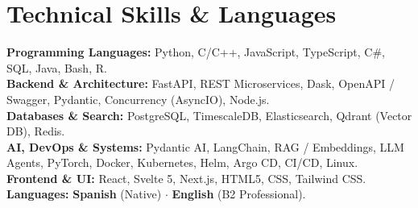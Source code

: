 \documentclass[a4paper,10pt]{article}
\begin{document}
\section*{Technical Skills \& Languages}

{\footnotesize
\noindent\textbf{Programming Languages:} Python, C/C++, JavaScript, TypeScript, C\#, SQL, Java, Bash, R. \\[2.5pt]
\textbf{Backend \& Architecture:} FastAPI, REST Microservices, Dask, OpenAPI / Swagger, Pydantic, Concurrency (AsyncIO), Node.js. \\[2.5pt]
\textbf{Databases \& Search:} PostgreSQL, TimescaleDB, Elasticsearch, Qdrant (Vector DB), Redis. \\[2.5pt]
\textbf{AI, DevOps \& Systems:} Pydantic AI, LangChain, RAG / Embeddings, LLM Agents, PyTorch, Docker, Kubernetes, Helm, Argo CD, CI/CD, Linux. \\[2.5pt]
\textbf{Frontend \& UI:} React, Svelte 5, Next.js, HTML5, CSS, Tailwind CSS. \hfill \textbf{Languages:} \textbf{Spanish} (Native) \enskip $\cdot$ \enskip \textbf{English} (B2 Professional).
}
\end{document}
